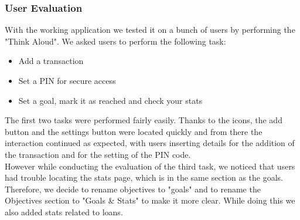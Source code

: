 \documentclass[a4paper,12pt]{article}
\begin{document}
\subsubsection{User Evaluation}
With the working application we tested it on a bunch of users by performing the "Think Aloud". We asked users to perform the following task:
\begin{itemize}
    \item Add a transaction
    \item Set a PIN for secure access
    \item Set a goal, mark it as reached and check your stats
\end{itemize}
The first two tasks were performed fairly easily. Thanks to the icons, the add button and the settings button were located quickly and from there the interaction continued as expected, with users inserting details for the addition of the transaction and for the setting of the PIN code.
\vspace{0.5cm}\\
However while conducting the evaluation of the third task, we noticed that users had trouble locating the stats page, which is in the same section as the goals.
Therefore, we decide to rename objectives to "goals" and to rename the Objectives section to "Goals \& Stats" to make it more clear.
While doing this we also added stats related to loans.
\end{document}
